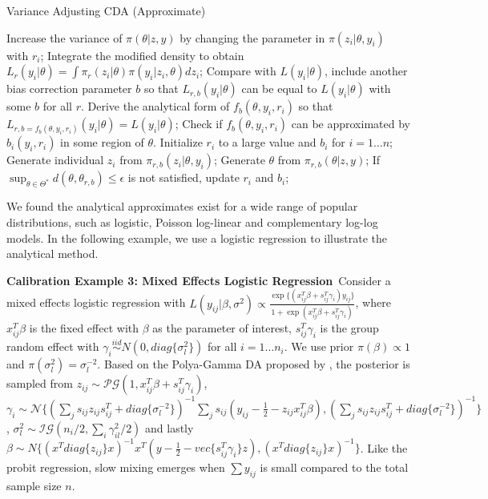 \documentclass[10pt]{article}
\newcommand{\xbetaij}{ x_{ij}^T \beta}
\newcommand{\sgamma}{s_{ij}^T\gamma_i}
\begin{document}
\begin{algorithm}[H]
		\caption{Variance Adjusting CDA (Approximate)}
		\label{numerical_cda}
		    \begin{algorithmic}
			\State Increase the variance of $\pi(\theta| z,y)$ by changing the parameter in $\pi(z_i |\theta,y_i)$ with $r_i$;
		\State Integrate the modified density to obtain $L_r(y_i|\theta)= \int \pi_r (z_i|\theta) \pi(y_i|z_i,\theta) d z_i$; 
		\State Compare with $L(y_i|\theta)$, include another bias correction parameter $b$ so that $L_{r,b}(y_i|\theta)$ can be equal to $L(y_i|\theta)$ with some $b$ for all $r$.
		\State Derive the analytical form of $f_b(\theta,y_i,r_i)$ so that $L_{r,b={f_b(\theta,y_i,r_i)}}(y_i|\theta)=L(y_i|\theta)$;
		\State Check if $f_b(\theta,y_i,r_i)$ can be approximated by $b_i(y_i,r_i)$ in some region of $\theta$.
		\State Initialize $r_i$ to a large value and $b_i$  for $i=1\ldots n$;
		\State {}
		\State Generate individual $z_i$ from $\pi_{r,b}(z_i|\theta, y_i)$;
		\State Generate $\theta$ from $\pi_{r,b}(\theta|z, y)$;
		\State If  $ \sup_{\theta \in \varTheta^*} d(\theta, \theta_{r,b})\le \epsilon$ is not satisfied, update $r_i$ and $b_i$;
		\EndFor
		\end{algorithmic}
\end{algorithm}

We found the analytical approximates exist for a wide range of popular distributions, such as logistic, Poisson log-linear and complementary log-log models. In the following example, we use a logistic regression to illustrate the analytical method.


{\bf Calibration Example 3: Mixed Effects Logistic Regression}\
Consider a mixed effects logistic regression with  $L(y_{ij} |\beta, \sigma^2)\propto \frac{\exp\{ (\xbetaij+\sgamma) y_{ij} \} }{1+ \exp(\xbetaij+\sgamma)}$, where $x_{ij}^T\beta$ is the fixed effect with $\beta$ as the parameter of interest, $\sgamma$ is the group random effect with $\gamma_{i} \stackrel{iid}{\sim} N(0, diag\{ \sigma_l^2\})$ for all $i=1\ldots n_i$. We use prior $\pi(\beta)\propto 1$ and $\pi(\sigma_l^2)=\sigma_l^{-2}$. Based on the Polya-Gamma DA proposed by \cite{polson2013bayesian}, the posterior is sampled from $z_{ij}\sim \mathcal{PG}(1, \xbetaij+\sgamma)$, $\gamma_i \sim \mathcal{N}\{  (\sum_j s_{ij} z_{ij} s_{ij}^T   + diag\{\sigma_l^{-2}\}  )^{-1}   \sum_j  s_{ij}   (y_{ij}-\frac{1}{2} - z_{ij} \xbetaij)  ,  ( \sum_j  s_{ij}  z_{ij} s_{ij}^T   + diag\{\sigma_l^{-2}\}  )^{-1}   \}$, $\sigma_l^{2}\sim \mathcal{IG}(n_i/2, \sum_i \gamma_{il}^2/2)$ and lastly $\beta \sim N\{  (x^T diag\{z_{ij}\}x)^{-1}   x^T  (y-\frac{1}{2} -   vec \{ s_{ij}^T\gamma_i \} z)  ,  (x^T diag\{z_{ij}\}x)^{-1}   \}$. Like the probit regression, slow mixing emerges when $\sum y_{ij}$ is small compared to the total sample size $n$.
\end{document}
